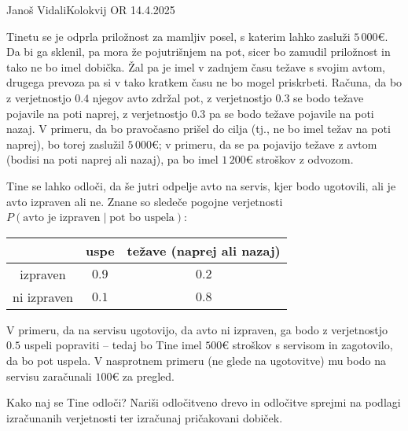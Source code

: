 \begin{naloga}{Janoš Vidali}{Kolokvij OR 14.4.2025}
\begin{vprasanje}
Tinetu se je odprla priložnost za mamljiv posel,
s katerim lahko zasluži $5\,000 €$.
Da bi ga sklenil, pa mora že pojutrišnjem na pot,
sicer bo zamudil priložnost in tako ne bo imel dobička.
Žal pa je imel v zadnjem času težave s svojim avtom,
drugega prevoza pa si v tako kratkem času ne bo mogel priskrbeti.
Računa, da bo z verjetnostjo $0.4$ njegov avto zdržal pot,
z verjetnostjo $0.3$ se bodo težave pojavile na poti naprej,
z verjetnostjo $0.3$ pa se bodo težave pojavile na poti nazaj.
V primeru, da bo pravočasno prišel do cilja
(tj., ne bo imel težav na poti naprej),
bo torej zaslužil $5\,000 €$;
v primeru, da se pa pojavijo težave z avtom
(bodisi na poti naprej ali nazaj),
pa bo imel $1\,200 €$ stroškov z odvozom.

Tine se lahko odloči, da še jutri odpelje avto na servis,
kjer bodo ugotovili, ali je avto izpraven ali ne.
Znane so sledeče pogojne verjetnosti
$P(\text{avto je izpraven} \mid \text{pot bo uspela})$:
\begin{center}
	\begin{tabular}{c|cc}
		& uspe & težave (naprej ali nazaj) \\ \hline
		izpraven & $0.9$ & $0.2$ \\
		ni izpraven & $0.1$ & $0.8$
	\end{tabular}
\end{center}
V primeru, da na servisu ugotovijo, da avto ni izpraven,
ga bodo z verjetnostjo $0.5$ uspeli popraviti
-- tedaj bo Tine imel $500 €$ stroškov s servisom in zagotovilo,
da bo pot uspela.
V nasprotnem primeru (ne glede na ugotovitve)
mu bodo na servisu zaračunali $100 €$ za pregled.

Kako naj se Tine odloči?
Nariši odločitveno drevo in odločitve sprejmi na podlagi izračunanih verjetnosti
ter izračunaj pričakovani dobiček.
\end{vprasanje}


\end{naloga}
